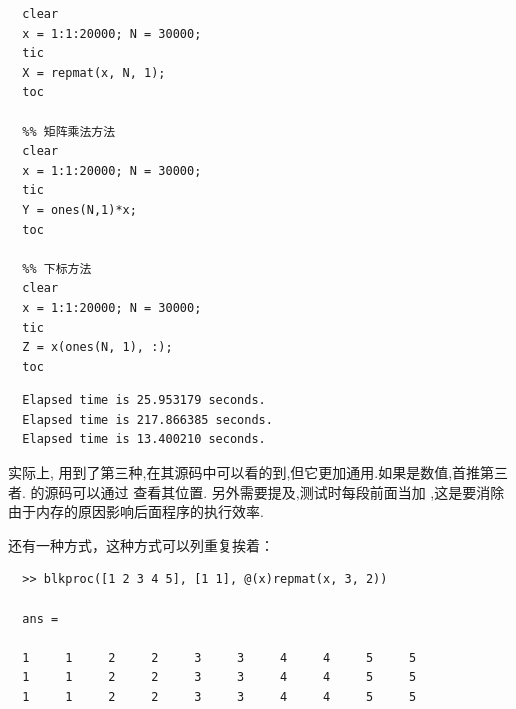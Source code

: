 \vspace{-0.8cm}
\begin{lstlisting}[caption = 重复向量以构造矩阵]
  %% repmat 函数方法
  clear
  x = 1:1:20000; N = 30000;
  tic
  X = repmat(x, N, 1);
  toc

  %% 矩阵乘法方法
  clear
  x = 1:1:20000; N = 30000;
  tic
  Y = ones(N,1)*x;
  toc
  
  %% 下标方法
  clear
  x = 1:1:20000; N = 30000;
  tic
  Z = x(ones(N, 1), :);
  toc
\end{lstlisting}

\vspace{-0.8cm}
\begin{lstlisting}
  Elapsed time is 25.953179 seconds.
  Elapsed time is 217.866385 seconds.
  Elapsed time is 13.400210 seconds.
\end{lstlisting}

实际上,  用到了第三种,在其源码中可以看的到,但它更加通用.如果是数值,首推第三者.
  的源码可以通过  查看其位置. 另外需要提及,测试时每段前面当加 ,这是要消除由于内存的原因影响后面程序的执行效率.\par

还有一种方式，这种方式可以列重复挨着：

\vspace{-0.4cm}
\begin{lstlisting}
  >> blkproc([1 2 3 4 5], [1 1], @(x)repmat(x, 3, 2))

  ans =

  1     1     2     2     3     3     4     4     5     5
  1     1     2     2     3     3     4     4     5     5
  1     1     2     2     3     3     4     4     5     5 
\end{lstlisting}

